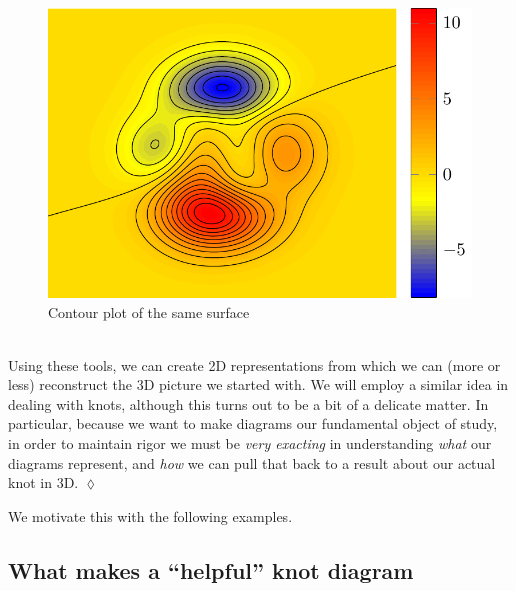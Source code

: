 \begin{minipage}{.49\linewidth}
  \begin{figure}[H]
    \centering
    \includegraphics[scale=.37]{figures/background/surface-contour.pdf}
    \caption{Contour plot of the same surface}
  \end{figure}
\end{minipage}\\
Using these tools, we can create 2D representations from which we can
(more or less) reconstruct the $3$D picture we started with. We will
employ a similar idea in dealing with knots, although this turns out
to be a bit of a delicate matter. In particular, because we want to
make diagrams our fundamental object of study, in order to maintain
rigor we must be \emph{very exacting} in understanding \emph{what} our
diagrams represent, and \emph{how} we can pull that back to a result
about our actual knot in $3$D. \hfill $\lozenge$

We motivate this with the following examples.
\subsection{What makes a ``helpful'' knot diagram}

